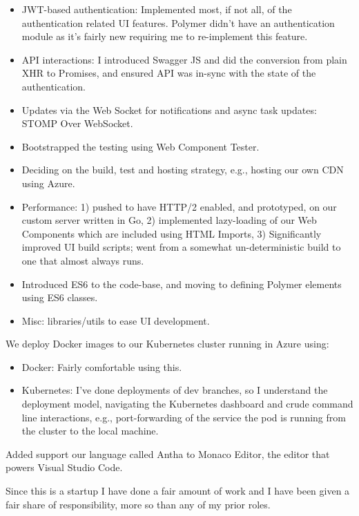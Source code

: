 \documentclass[
  a4paper,
]{article}
\providecommand{\tightlist}{%
  \setlength{\itemsep}{0pt}\setlength{\parskip}{0pt}}
\begin{document}
\begin{itemize}
\tightlist
\item
  JWT-based authentication: Implemented most, if not all, of the
  authentication related UI features. Polymer didn't have an
  authentication module as it's fairly new requiring me to re-implement
  this feature.
\item
  API interactions: I introduced Swagger JS and did the conversion from
  plain XHR to Promises, and ensured API was in-sync with the state of
  the authentication.
\item
  Updates via the Web Socket for notifications and async task updates:
  STOMP Over WebSocket.
\item
  Bootstrapped the testing using Web Component Tester.
\item
  Deciding on the build, test and hosting strategy, e.g., hosting our
  own CDN using Azure.
\item
  Performance: 1) pushed to have HTTP/2 enabled, and prototyped, on our
  custom server written in Go, 2) implemented lazy-loading of our Web
  Components which are included using HTML Imports, 3) Significantly
  improved UI build scripts; went from a somewhat un-deterministic build
  to one that almost always runs.
\item
  Introduced ES6 to the code-base, and moving to defining Polymer
  elements using ES6 classes.
\item
  Misc: libraries/utils to ease UI development.
\end{itemize}

We deploy Docker images to our Kubernetes cluster running in Azure
using:

\begin{itemize}
\tightlist
\item
  Docker: Fairly comfortable using this.
\item
  Kubernetes: I've done deployments of dev branches, so I understand the
  deployment model, navigating the Kubernetes dashboard and crude
  command line interactions, e.g., port-forwarding of the service the
  pod is running from the cluster to the local machine.
\end{itemize}

Added support our language called Antha to Monaco Editor, the editor
that powers Visual Studio Code.

Since this is a startup I have done a fair amount of work and I have
been given a fair share of responsibility, more so than any of my prior
roles.
\end{document}
